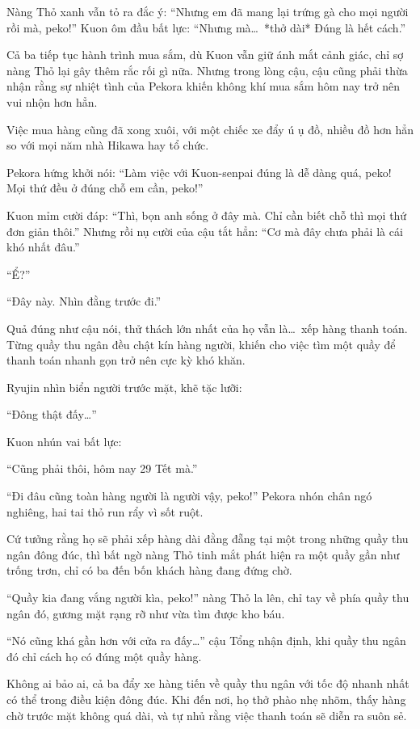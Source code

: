 \documentclass[../main.tex]{subfiles}
\begin{document}
Nàng Thỏ xanh vẫn tỏ ra đắc ý: ``Nhưng em đã mang lại trứng gà cho mọi người rồi mà, peko!'' Kuon ôm đầu bất lực: ``Nhưng mà\dots\ *thở dài* Đúng là hết cách.''

Cả ba tiếp tục hành trình mua sắm, dù Kuon vẫn giữ ánh mắt cảnh giác, chỉ sợ nàng Thỏ lại gây thêm rắc rối gì nữa. Nhưng trong lòng cậu, cậu cũng phải thừa nhận rằng sự nhiệt tình của Pekora khiến không khí mua sắm hôm nay trở nên vui nhộn hơn hẳn.

\ct

Việc mua hàng cũng đã xong xuôi, với một chiếc xe đẩy ú ụ đồ, nhiều đồ hơn hẳn so với mọi năm nhà Hikawa hay tổ chức.

Pekora hứng khởi nói: ``Làm việc với Kuon-senpai đúng là dễ dàng quá, peko! Mọi thứ đều ở đúng chỗ em cần, peko!''

Kuon mỉm cười đáp: ``Thì, bọn anh sống ở đây mà. Chỉ cần biết chỗ thì mọi thứ đơn giản thôi.'' Nhưng rồi nụ cười của cậu tắt hẳn: ``Cơ mà đây chưa phải là cái khó nhất đâu.''

``Ể?''

``Đây này. Nhìn đằng trước đi.''

Quả đúng như cậu nói, thử thách lớn nhất của họ vẫn là\dots\ xếp hàng thanh toán. Từng quầy thu ngân đều chật kín hàng người, khiến cho việc tìm một quầy để thanh toán nhanh gọn trở nên cực kỳ khó khăn.

Ryujin nhìn biển người trước mặt, khẽ tặc lưỡi:

``Đông thật đấy\dots''

Kuon nhún vai bất lực:

``Cũng phải thôi, hôm nay 29 Tết mà.''

``Đi đâu cũng toàn hàng người là người vậy, peko!'' Pekora nhón chân ngó nghiêng, hai tai thỏ run rẩy vì sốt ruột.

Cứ tưởng rằng họ sẽ phải xếp hàng dài đằng đẵng tại một trong những quầy thu ngân đông đúc, thì bất ngờ nàng Thỏ tinh mắt phát hiện ra một quầy gần như trống trơn, chỉ có ba đến bốn khách hàng đang đứng chờ.

``Quầy kia đang vắng người kìa, peko!'' nàng Thỏ la lên, chỉ tay về phía quầy thu ngân đó, gương mặt rạng rỡ như vừa tìm được kho báu.

``Nó cũng khá gần hơn với cửa ra đấy\dots'' cậu Tổng nhận định, khi quầy thu ngân đó chỉ cách họ có đúng một quầy hàng.

Không ai bảo ai, cả ba đẩy xe hàng tiến về quầy thu ngân với tốc độ nhanh nhất có thể trong điều kiện đông đúc. Khi đến nơi, họ thở phào nhẹ nhõm, thấy hàng chờ trước mặt không quá dài, và tự nhủ rằng việc thanh toán sẽ diễn ra suôn sẻ.
\end{document}
